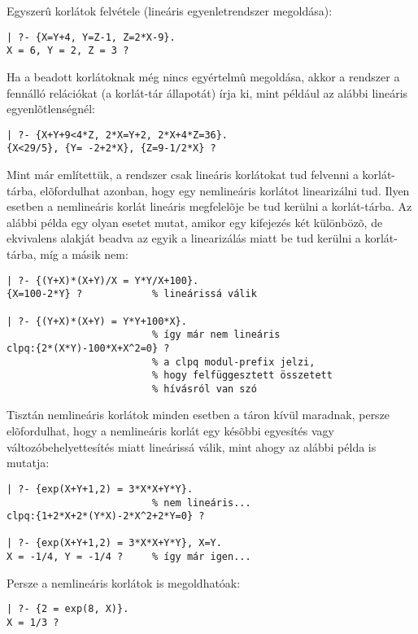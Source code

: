 Egyszerû korlátok felvétele (lineáris egyenletrendszer megoldása):

\begin{verbatim}
| ?- {X=Y+4, Y=Z-1, Z=2*X-9}.   
X = 6, Y = 2, Z = 3 ?
\end{verbatim}

Ha a beadott korlátoknak még nincs egyértelmû megoldása, akkor a
\clpq rendszer a fennálló relációkat (a korlát-tár állapotát)
írja ki, mint például az alábbi lineáris egyenlõtlenségnél:

\begin{verbatim}
| ?- {X+Y+9<4*Z, 2*X=Y+2, 2*X+4*Z=36}.  
{X<29/5}, {Y= -2+2*X}, {Z=9-1/2*X} ?    
\end{verbatim}

Mint már említettük, a \clpq rendszer csak lineáris korlátokat
tud felvenni a korlát-tárba, elõfordulhat azonban, hogy egy nemlineáris
korlátot linearizálni tud. Ilyen esetben a nemlineáris korlát lineáris
megfelelõje be tud kerülni a korlát-tárba. Az alábbi példa egy olyan esetet
mutat, amikor egy kifejezés két különbözõ, de ekvivalens alakját beadva az
egyik a linearizálás miatt be tud kerülni a korlát-tárba, míg a másik nem:

\begin{verbatim}
| ?- {(Y+X)*(X+Y)/X = Y*Y/X+100}.       
{X=100-2*Y} ?            % lineárissá válik

| ?- {(Y+X)*(X+Y) = Y*Y+100*X}.         
                         % így már nem lineáris
clpq:{2*(X*Y)-100*X+X^2=0} ?             
                         % a clpq modul-prefix jelzi,
                         % hogy felfüggesztett összetett
                         % hívásról van szó
\end{verbatim}

Tisztán nemlineáris korlátok minden esetben a táron kívül maradnak, persze
elõfordulhat, hogy a nemlineáris korlát egy késõbbi egyesítés vagy
változóbehelyettesítés miatt lineárissá válik, mint ahogy az alábbi
példa is mutatja:

\begin{verbatim}
| ?- {exp(X+Y+1,2) = 3*X*X+Y*Y}.        
                         % nem lineáris...
clpq:{1+2*X+2*(Y*X)-2*X^2+2*Y=0} ? 

| ?- {exp(X+Y+1,2) = 3*X*X+Y*Y}, X=Y.   
X = -1/4, Y = -1/4 ?     % így már igen...
\end{verbatim}

Persze a nemlineáris korlátok is megoldhatóak:

\begin{verbatim}
| ?- {2 = exp(8, X)}.
X = 1/3 ?
\end{verbatim}


